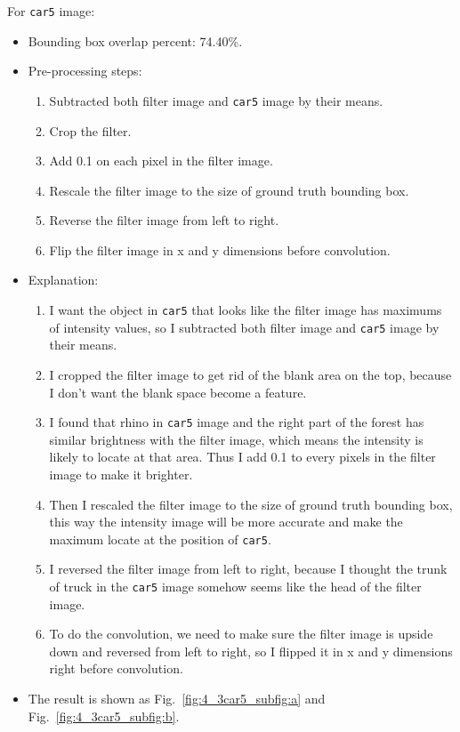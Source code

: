 \documentclass{assignment}
\begin{document}
\begin{problemlist}
For \texttt{car5} image:
\begin{itemize}
    \item Bounding box overlap percent: 74.40\%.
    \item Pre-processing steps: 
    \begin{enumerate}[label={\alph*)}]
        \item Subtracted both filter image and \texttt{car5} image by their means.
        \item Crop the filter.
        \item Add 0.1 on each pixel in the filter image.
        \item Rescale the filter image to the size of ground truth bounding box.
        \item Reverse the filter image from left to right.
        \item Flip the filter image in x and y dimensions before convolution.
    \end{enumerate}
    \item Explanation: 
    \begin{enumerate}[label={\alph*)}]
        \item I want the object in \texttt{car5} that looks like the filter image has maximums of intensity values, so I subtracted both filter image and \texttt{car5} image by their means.
        \item I cropped the filter image to get rid of the blank area on the top, because I don't want the blank space become a feature.
        \item I found that rhino in \texttt{car5} image and the right part of the forest has similar brightness with the filter image, which means the intensity is likely to locate at that area. Thus I add 0.1 to every pixels in the filter image to make it brighter.
        \item Then I rescaled the filter image to the size of ground truth bounding box, this way the intensity image will be more accurate and make the maximum locate at the position of \texttt{car5}.
        \item I reversed the filter image from left to right, because I thought the trunk of truck in the \texttt{car5} image somehow seems like the head of the filter image.
        \item To do the convolution, we need to make sure the filter image is upside down and reversed from left to right, so I flipped it in x and y dimensions right before convolution.
    \end{enumerate}
    \item The result is shown as Fig.~\ref{fig:4_3car5_subfig:a} and Fig.~\ref{fig:4_3car5_subfig:b}.
\end{itemize}


\end{problemlist}
\end{document}
